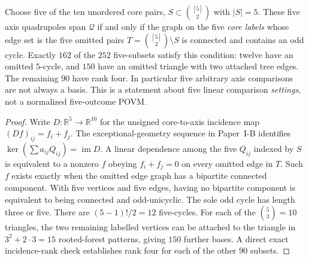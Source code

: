\documentclass[12pt,a4paper]{article}
\begin{document}
\begin{theorem}
\label{p2c:thm:v318-five-probe-criterion}
Choose five of the ten unordered core pairs, $S\subset\binom{[5]}2$
with $|S|=5$.  These five axis quadrupoles span $\mathcal Q$ if and
only if the graph on the five \emph{core labels} whose edge set is
the five omitted pairs $T=\binom{[5]}2\setminus S$ is connected and
contains an odd cycle.  Exactly $162$ of the $252$ five-subsets satisfy
this condition: twelve have an omitted $5$-cycle, and $150$ have an
omitted triangle with two attached tree edges.  The remaining $90$
have rank four.  In particular five arbitrary axis comparisons are
not always a basis.  This is a statement about five linear comparison
\emph{settings}, not a normalized five-outcome POVM.
\end{theorem}
\begin{proof}
Write $D:\mathbb R^5\to\mathbb R^{10}$ for the unsigned
core-to-axis incidence map $(Df)_{ij}=f_i+f_j$.
The exceptional-geometry sequence in Paper~I-B identifies
$\ker(\sum a_{ij}Q_{ij})=\operatorname{im}D$.
A linear dependence among the five $Q_{ij}$ indexed by $S$
is equivalent to a nonzero $f$ obeying $f_i+f_j=0$ on every
omitted edge in $T$.  Such $f$ exists exactly when the omitted
edge graph has a bipartite connected component.  With five vertices
and five edges, having no bipartite component is equivalent to
being connected and odd-unicyclic.  The sole odd cycle has length
three or five.  There are $(5-1)!/2=12$ five-cycles.  For each of
the $\binom53=10$ triangles, the two remaining labelled vertices
can be attached to the triangle in $3^2+2\cdot3=15$ rooted-forest
patterns, giving $150$ further bases.  A direct exact incidence-rank
check establishes rank four for each of the other $90$ subsets.
\end{proof}
\end{document}
